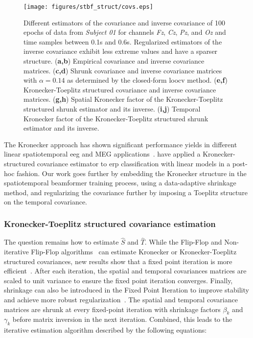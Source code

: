 	\begin{figure}
		\texttt{[image: figures/stbf\_struct/covs.eps]}
    \caption[Estimated covariance and inverse covariance.]{Different estimators of the covariance and inverse covariance
			of 100 epochs of data from \textit{Subject 01} for channels
			\textit{Fz}, \textit{Cz}, \textit{Pz}, and \textit{Oz} and time samples between 0.1s and 0.6s.
			Regularized estimators of the inverse covariance exhibit less extreme values and have a sparser structure.
			(\textbf{a,b}) Empirical covariance and inverse covariance matrices.
			(\textbf{c,d}) Shrunk covariance and inverse covariance matrices with $\alpha=0.14$ as
			determined by the closed-form \ac{loocv} method. (\textbf{e,f}) Kronecker-Toeplitz
			structured covariance and inverse covariance matrices.
			(\textbf{g,h}) Spatial Kronecker factor of the Kronecker-Toeplitz structured shrunk estimator and its inverse.
			(\textbf{i,j}) Temporal Kronecker factor of the Kronecker-Toeplitz structured shrunk estimator and its inverse.}
		\label{fig:kronlda-covs}
	\end{figure}

	The Kronecker approach has shown significant performance yields in different linear spatiotemporal \ac{eeg} and MEG
	applications~\cite{DeMunck2002,Huizenga2002,Beltrachini2013,GonzalezNavarro2016,GonzalezNavarro2017}.
	\textcite{Vliet2020} have applied a Kronecker-structured covariance estimator to \ac{erp} classification with linear models in a post-hoc fashion.
	Our work goes further by embedding the Kronecker structure in the
	spatiotemporal beamformer training process, using a data-adaptive shrinkage
	method, and regularizing the covariance further by imposing a Toeplitz
	structure on the temporal covariance.

	\subsubsection{Kronecker-Toeplitz structured covariance estimation}
	\label{sec:structured_covariance}
	The question remains how to estimate $\hat{S}$ and $\hat{T}$.
	While the Flip-Flop and Non-iterative Flip-Flop
	algorithms~\cite{Lu2005, Werner2008, Wirfaelt2010} can estimate Kronecker or Kronecker-Toeplitz structured covariances, new results show that a fixed point iteration is more efficient~\cite{Wiesel2012a,Wiesel2012}.
	After each iteration, the spatial and temporal covariances matrices are scaled to unit
	variance to ensure the fixed point iteration converges.
	Finally, shrinkage can also be introduced in the Fixed Point Iteration to
	improve stability and achieve more robust
	regularization~\cite{Wiesel2012,Greenewald2014,Beltrachini2013, Breloy2016}.
	The spatial and temporal covariance matrices are shrunk at every fixed-point
	iteration with shrinkage factors $\beta_k$ and $\gamma_k$ before matrix
	inversion in the
	next iteration.
	Combined, this leads to the iterative estimation algorithm described by the
	following equations:


